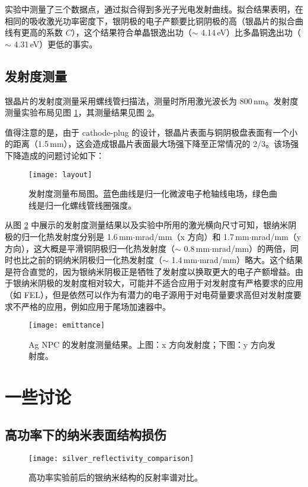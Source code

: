 实验中测量了三个数据点，通过拟合得到多光子光电发射曲线。拟合结果表明，在相同的吸收激光功率密度下，银阴极的电子产额要比铜阴极的高（银晶片的拟合曲线有更高的系数 $C$），这个结果符合单晶银逸出功（$\sim$ 4.14\,eV）比多晶铜逸出功（$\sim$ 4.31\,eV）更低的事实。

\subsection{发射度测量\label{ssec:emit}}
银晶片的发射度测量采用螺线管扫描法，测量时所用激光波长为 800\,nm。发射度测量实验布局见图 \ref{fig:layout}，其测量结果见图 \ref{fig:emittance}。

值得注意的是，由于 cathode-plug 的设计，银晶片表面与铜阴极盘表面有一个小的距离（1.5\,mm），这会造成银晶片表面最大场强下降至正常情况的 2/3。该场强下降造成的问题讨论如下：

\begin{figure}[htbp]
\begin{center}
\texttt{[image: layout]}
\caption{\label{fig:layout} 
发射度测量布局图。蓝色曲线是归一化微波电子枪轴线电场，绿色曲线是归一化螺线管线圈强度。}
\end{center}
\end{figure}

从图 \ref{fig:emittance} 中展示的发射度测量结果以及实验中所用的激光横向尺寸可知，银纳米阴极的归一化热发射度分别是 1.6\,mm$\cdot$mrad/mm（x 方向）和 1.7\,mm$\cdot$mrad/mm（y 方向），这大概是平滑铜阴极归一化热发射度（$\sim$ 0.8\,mm$\cdot$mrad/mm）的两倍，同时也比之前的铜纳米阴极归一化热发射度（$\sim$ 1.4\,mm$\cdot$mrad/mm）略大。这个结果是符合直觉的，因为银纳米阴极正是牺牲了发射度以换取更大的电子产额增益。由于银纳米阴极的发射度相对较大，可能并不适合应用于对发射度有严格要求的应用（如 FEL），但是依然可以作为有潜力的电子源用于对电荷量要求高但对发射度要求不严格的应用，例如应用于尾场加速器中。
\begin{figure}[htbp]
\begin{center}
\texttt{[image: emittance]}
\caption{\label{fig:emittance} 
Ag NPC 的发射度测量结果。上图：x 方向发射度；下图：y 方向发射度。}
\end{center}
\end{figure}

\section{一些讨论\label{sec:misc}}
\subsection{高功率下的纳米表面结构损伤}
\begin{figure}[htbp]
\begin{center}
\texttt{[image: silver\_reflectivity\_comparison]}
\caption{\label{fig:afterhighpower} 高功率实验前后的银纳米结构的反射率谱对比。}
\end{center}
\end{figure}

